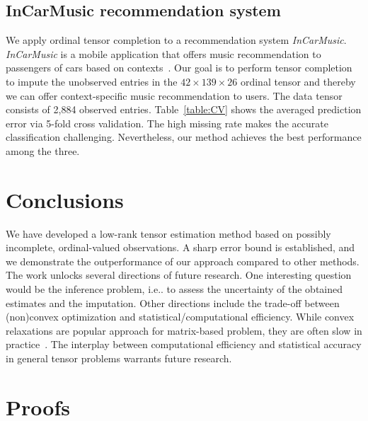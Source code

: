 \documentclass[11pt]{article}
\theoremstyle{plain}
\theoremstyle{definition}
\begin{document}
\subsection{InCarMusic recommendation system}
We apply ordinal tensor completion to a recommendation system {\it InCarMusic}. {\it InCarMusic} is a mobile application that offers music recommendation to passengers of cars based on contexts~\cite{baltrunas2011incarmusic}. Our goal is to perform tensor completion to impute the unobserved entries in the $42\times 139\times 26$ ordinal tensor and thereby we can offer context-specific music recommendation to users. The data tensor consists of 2,884 observed entries. Table~\ref{table:CV} shows the averaged prediction error via 5-fold cross validation. The high missing rate makes the accurate classification challenging. Nevertheless, our method achieves the best performance among the three.

\section{Conclusions}
We have developed a low-rank tensor estimation method based on possibly incomplete, ordinal-valued observations. A sharp error bound is established, and we demonstrate the outperformance of our approach compared to other methods. The work unlocks several directions of future research. One interesting question would be the inference problem, i.e.. to assess the uncertainty of the obtained estimates and the imputation. Other directions include the trade-off between (non)convex optimization and statistical/computational efficiency. While convex relaxations are popular approach for matrix-based problem, they are often slow in practice~\cite{chen2019non}. The interplay between computational efficiency and statistical accuracy in general tensor problems warrants future research.


\section{Proofs}\label{sec:proof}
\end{document}
